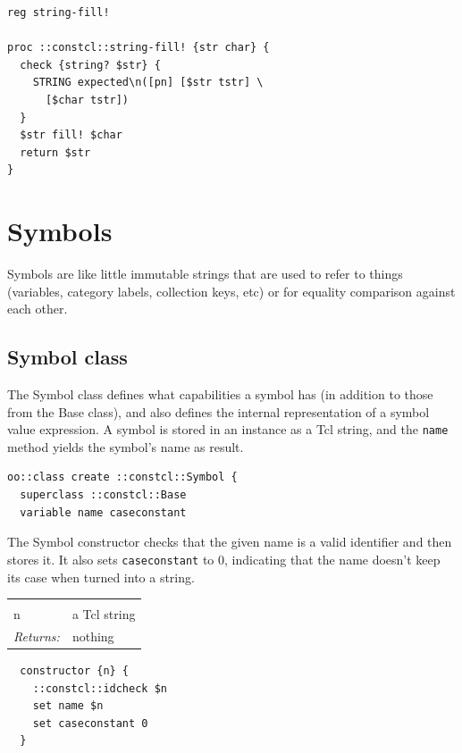 \documentclass[a5paper,draft]{memoir}
\begin{document}
\begin{lstlisting}
reg string-fill!

proc ::constcl::string-fill! {str char} {
  check {string? $str} {
    STRING expected\n([pn] [$str tstr] \
      [$char tstr])
  }
  $str fill! $char
  return $str
}
\end{lstlisting}

\section{Symbols}
\label{symbols}

Symbols are like little immutable strings that are used to refer to things (variables, category labels, collection keys, etc) or for equality comparison against each other.

\subsection{Symbol class}
\label{symbol-class}

The Symbol class defines what capabilities a symbol has (in addition to those from the Base class), and also defines the internal representation of a symbol value expression. A symbol is stored in an instance as a Tcl string, and the \texttt{name} method yields the symbol's name as result.

\begin{lstlisting}
oo::class create ::constcl::Symbol {
  superclass ::constcl::Base
  variable name caseconstant
\end{lstlisting}

The Symbol constructor checks that the given name is a valid identifier and then stores it. It also sets \texttt{caseconstant} to 0, indicating that the name doesn't keep its case when turned into a string.

\noindent\begin{tabular}{ |p{1.9cm} p{6.5cm}| }
\hline
\rowcolor[HTML]{CCCCCC} \multicolumn{2}{|l|}{\textbf{Symbol constructor (internal)}} \\
n & a Tcl string \\
\textit{Returns:} & nothing \\
\hline
\end{tabular}

\begin{lstlisting}
  constructor {n} {
    ::constcl::idcheck $n
    set name $n
    set caseconstant 0
  }
\end{lstlisting}
\end{document}
